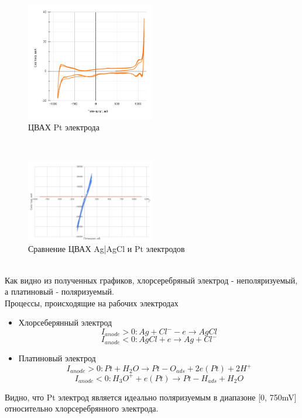 \documentclass[a4paper,12pt]{article}
\begin{document}
\begin{figure}[H]
    \centering
    \includegraphics[width = 0.5\textwidth]{202.png}
    \caption{ЦВАХ Pt электрода}
    \label{fig:no_int}
\end{figure}\\

\begin{figure}[H]
    \centering
    \includegraphics[width = 0.5\textwidth]{200.png}
    \caption{Сравнение ЦВАХ Ag|AgCl и Pt электродов}
    \label{fig:no_int}
\end{figure}\\

Как видно из полученных графиков, хлорсеребряный электрод - неполяризуемый, а платиновый - поляризуемый. \\
Процессы, происходящие на рабочих электродах
\begin{itemize}
    \item Хлорсеберянный электрод
    \begin{equation*}
        I_{anode} > 0 : Ag + Cl^- - e \rightarrow AgCl
    \end{equation*}
    \begin{equation*}
        I_{anode} < 0: AgCl + e \rightarrow Ag + Cl^-
    \end{equation*}
    \item Платиновый электрод
    \begin{equation*}
        I_{anode}> 0: Pt + H_2O \rightarrow Pt - O_{ads} + 2e(Pt) + 2H^+
    \end{equation*}
    \begin{equation*}
        I_{anode} < 0: H_3O^+ + e(Pt) \rightarrow Pt - H_{ads} + H_2O
    \end{equation*}
\end{itemize}
Видно, что Pt электрод является идеально поляризуемым в диапазоне [0, 750mV] относительно хлорсеребрянного электрода. 
\end{document}
